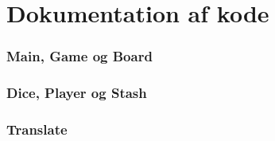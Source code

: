 \section{Dokumentation af kode}

\subsubsection{Main, Game og Board}

\subsubsection{Dice, Player og Stash}

\subsubsection{Translate}